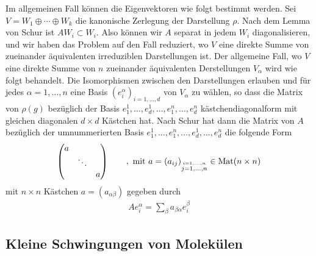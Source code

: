 \begin{bemerkung}
    Im allgemeinen Fall können die Eigenvektoren wie folgt
    bestimmt werden. Sei $V = W_1 \oplus \dotsb \oplus W_k$ die kanonische
    Zerlegung der Darstellung $\rho$. Nach dem Lemma von Schur ist $A W_i
    \subset W_i$. Also können wir $A$ separat in jedem $W_i$ diagonalisieren,
    und wir haben das Problem auf den Fall reduziert, wo $V$ eine direkte
    Summe von zueinander äquivalenten irreduziblen Darstellungen ist.
    Der allgemeine Fall, wo $V$ eine direkte Summe von $n$ zueinander
    äquivalenten Derstellungen $V_\alpha$ wird wie folgt behandelt.
    Die Isomorphismen zwischen den Darstellungen erlauben und für jedes
    $\alpha = 1,\dots,n$ eine Basis $(e_i^\alpha)_{i=1,\dots,d}$ von $V_\alpha$
    zu wählen, so dass die Matrix von $\rho(g)$ bezüglich der Basis
    $e_1^1,\dots,e_d^1,\dots,e_1^n,\dots,e_d^n$ kästchendiagonalform mit
    gleichen diagonalen $d \times d$ Kästchen hat. Nach Schur hat dann die
    Matrix von $A$ bezüglich der umnummerierten Basis $e_1^1,\dots,e_1^n,\dots,
    e_d^1,\dots,e_d^n$ die folgende Form
    \begin{align*}
        \begin{pmatrix}
            a & & \\
            & \ddots & \\
            & & a
        \end{pmatrix}
        \hspace{20pt} , \text{ mit } a = (a_{ij})_{\stackrel{i=1,\dots,n}{j=1,\dots,n}}
        \in \text{Mat}(n \times n)
    \end{align*}
    mit $n \times n$ Kästchen $a=(a_{\alpha \beta})$ gegeben durch
    \begin{align*}
        A e_i^\alpha = \sum_{\beta} a_{\beta \alpha} e_i^\beta
    \end{align*}
\end{bemerkung}


\subsection{Kleine Schwingungen von Molekülen}


